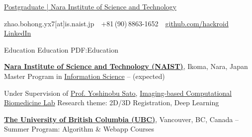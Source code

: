 \documentclass[a4paper,MMMyyyy,nonstopmode]{simpleresumecv}
\newcommand{\CVAuthor}{Bohong ZHAO}
\begin{document}

\Title{\CVAuthor}

\begin{SubTitle}
    \href{http://www.naist.jp/en/}
    {Postgraduate | Nara Institute of Science and Technology}
    \par
    zhao.bohong.yx7[at]is.naist.jp
    \,\SubBulletSymbol\,
    +81\,(90)\,8863-1652
    \,\SubBulletSymbol\,
    \href{https://github.com/hackroid/}{github.com/hackroid}
    \,\SubBulletSymbol\,
    \href{https://www.linkedin.com/in/%E5%8D%9A%E5%BC%98-%E8%B5%B5-b7ab09136/}{LinkedIn}
\end{SubTitle}

\begin{Body}


    \Section
    {Education}
    {Education}
    {PDF:Education}

    \Entry
    \href{http://www.naist.jp/en/}
    {\textbf{Nara Institute of Science and Technology (NAIST)}},
    Ikoma, Nara, Japan
    \Gap
    \BulletItem
    Master Program in
    \href{http://isw3.naist.jp/home-en.html}
    {Information Science}
    \hfill
     --
     (expected)
    \begin{Detail}
        \SubBulletItem
        Under Supervision of \href{http://icb-lab.naist.jp/members/yoshi/index.html}{Prof. Yoshinobu Sato}, \href{http://icb-lab.naist.jp/index.html}{Imaging-based Computational Biomedicine Lab}
        \SubBulletItem
        Research theme: 2D/3D Registration, Deep Learning
    \end{Detail}

    \Gap

    \Entry
    \href{https://www.ubc.ca/}
    {\textbf{The University of British Columbia (UBC)}},
    Vancouver, BC, Canada
    \hfill
     --
    \BulletItem
    Summer Program: Algorithm \& Webapp Courses

    \Gap


\end{Body}
\end{document}
